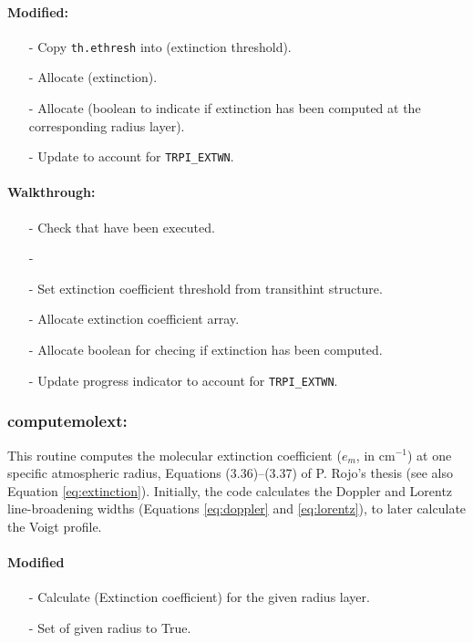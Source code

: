 \documentclass[letterpaper,12pt]{article}
\begin{document}
\paragraph{Modified:}
\begin{enumerate}[leftmargin=10pt, noitemsep, parsep=0pt, topsep=0ex]
\item[-] Copy {\tt th.ethresh} into  (extinction threshold).
\item[-] Allocate  (extinction).
\item[-] Allocate  (boolean to indicate if extinction has been computed at the corresponding radius layer).
\item[-] Update  to account for {\tt TRPI\_EXTWN}.
\end{enumerate}

\paragraph{Walkthrough:}
\begin{enumerate}[leftmargin=10pt, noitemsep, parsep=0pt, topsep=0ex]
\item[-] Check that  have been executed.
\item[-] 
\item[-] Set extinction coefficient threshold from transithint structure.
\item[-] Allocate extinction coefficient array.
\item[-] Allocate boolean for checing if extinction has been computed.
\item[-] Update progress indicator to account for {\tt TRPI\_EXTWN}.
\end{enumerate}

\subsubsection{computemolext:}
This routine computes the molecular extinction coefficient ($e_m$, in
cm$^{-1}$) at one specific atmospheric radius, Equations
(3.36)--(3.37) of P. Rojo's thesis (see also Equation
\ref{eq:extinction}).  Initially, the code calculates the Doppler and
Lorentz line-broadening widths (Equations \ref{eq:doppler} and
\ref{eq:lorentz}), to later calculate the Voigt profile.

\paragraph{Modified}
\begin{enumerate}[leftmargin=10pt, noitemsep, parsep=0pt, topsep=0ex]
\item[-] Calculate  (Extinction coefficient) for the given radius layer.
\item[-] Set  of given radius to True.
\end{enumerate}
\end{document}
